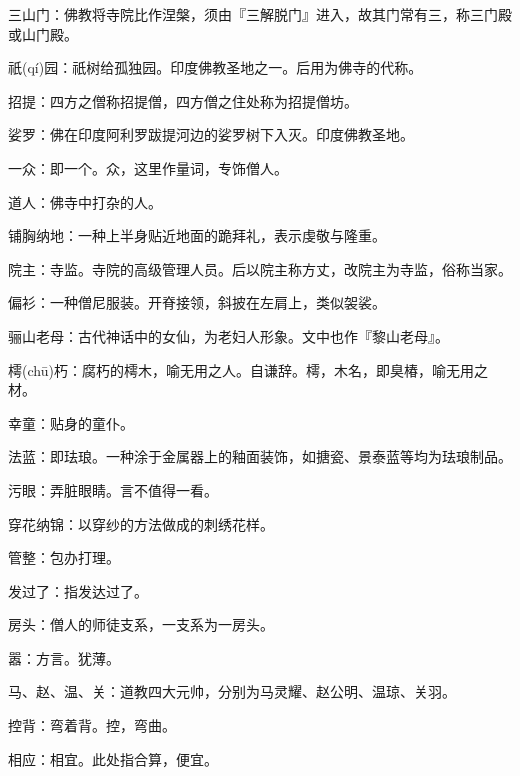 \startbuffer[642]
三山门：佛教将寺院比作涅槃，须由『三解脱门』进入，故其门常有三，称三门殿或山门殿。
\stopbuffer


\startbuffer[643]
祇(qí)园：祇树给孤独园。印度佛教圣地之一。后用为佛寺的代称。
\stopbuffer


\startbuffer[644]
招提：四方之僧称招提僧，四方僧之住处称为招提僧坊。
\stopbuffer


\startbuffer[645]
娑罗：佛在印度阿利罗跋提河边的娑罗树下入灭。印度佛教圣地。
\stopbuffer


\startbuffer[646]
一众：即一个。众，这里作量词，专饰僧人。
\stopbuffer


\startbuffer[647]
道人：佛寺中打杂的人。
\stopbuffer


\startbuffer[648]
铺胸纳地：一种上半身贴近地面的跪拜礼，表示虔敬与隆重。
\stopbuffer


\startbuffer[649]
院主：寺监。寺院的高级管理人员。后以院主称方丈，改院主为寺监，俗称当家。
\stopbuffer


\startbuffer[650]
偏衫：一种僧尼服装。开脊接领，斜披在左肩上，类似袈裟。
\stopbuffer


\startbuffer[651]
骊山老母：古代神话中的女仙，为老妇人形象。文中也作『黎山老母』。
\stopbuffer


\startbuffer[652]
樗(chū)朽：腐朽的樗木，喻无用之人。自谦辞。樗，木名，即臭椿，喻无用之材。
\stopbuffer


\startbuffer[653]
幸童：贴身的童仆。
\stopbuffer


\startbuffer[654]
法蓝：即珐琅。一种涂于金属器上的釉面装饰，如搪瓷、景泰蓝等均为珐琅制品。
\stopbuffer


\startbuffer[655]
污眼：弄脏眼睛。言不值得一看。
\stopbuffer


\startbuffer[656]
穿花纳锦：以穿纱的方法做成的刺绣花样。
\stopbuffer


\startbuffer[657]
管整：包办打理。
\stopbuffer


\startbuffer[658]
发过了：指发达过了。
\stopbuffer


\startbuffer[659]
房头：僧人的师徒支系，一支系为一房头。
\stopbuffer


\startbuffer[660]
嚣：方言。犹薄。
\stopbuffer


\startbuffer[661]
马、赵、温、关：道教四大元帅，分别为马灵耀、赵公明、温琼、关羽。
\stopbuffer


\startbuffer[662]
控背：弯着背。控，弯曲。
\stopbuffer


\startbuffer[663]
相应：相宜。此处指合算，便宜。
\stopbuffer


